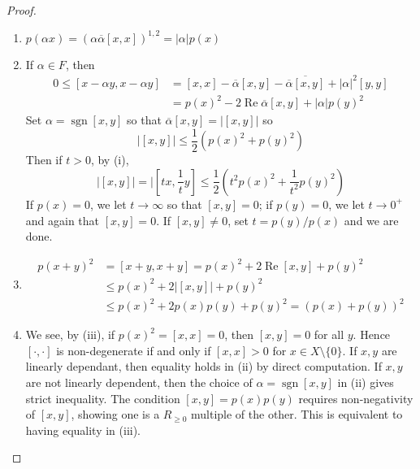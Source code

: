 \documentclass[11pt, a4paper]{memoir}
\theoremstyle{change}
\theoremstyle{plain}
\theoremstyle{nonumberplain}
\newtheorem{proof}{Proof}
\DeclareMathOperator{\sgn}{sgn}
\renewcommand{\Re}{\ensuremath{\operatorname{Re}}}
\newcommand{\lbr}[1]{\ensuremath{\left[#1\right]}}
\numberwithin{equation}{section}
\begin{document}
\begin{proof}
    \begin{enumerate}[nl,r]
        \item $p(\alpha x)=(\alpha\overline{\alpha}\lbr{x,x})^{1,2}=|\alpha|p(x)$
        \item If $\alpha\in F$, then
            \begin{align*}
                0\leq \lbr{x-\alpha y,x-\alpha y}&=\lbr{x,x}-\overline{\alpha}\lbr{x,y}-\overline{\overline{\alpha}\lbr{x,y}}+|\alpha|^2\lbr{y,y}\\
                                                 &= p(x)^2-2\Re\overline{\alpha}\lbr{x,y}+|\alpha|p(y)^2
            \end{align*}
            Set $\alpha=\sgn\lbr{x,y}$ so that $\overline{\alpha}\lbr{x,y}=|\lbr{x,y}|$ so
            \begin{equation*}
                |\lbr{x,y}|\leq\frac{1}{2}\left(p(x)^2+p(y)^2\right)
            \end{equation*}
            Then if $t>0$, by (i),
            \begin{equation*}
                |\lbr{x,y}|=|\lbr{tx,\frac{1}{t}y}\leq\frac{1}{2}(t^2p(x)^2+\frac{1}{t^2}p(y)^2)
            \end{equation*}
            If $p(x)=0$, we let $t\to\infty$ so that $\lbr{x,y}=0$; if $p(y)=0$, we let $t\to 0^+$ and again that $\lbr{x,y}=0$.
            If $\lbr{x,y}\neq 0$, set $t=p(y)/p(x)$ and we are done.
        \item
            \begin{align*}
                p(x+y)^2&=\lbr{x+y,x+y}=p(x)^2+2\Re[x,y]+p(y)^2\\
                        &\leq p(x)^2+2|\lbr{x,y}|+p(y)^2\\
                        &\leq p(x)^2+2p(x)p(y)+p(y)^2=(p(x)+p(y))^2
            \end{align*}
        \item We see, by (iii), if $p(x)^2=\lbr{x,x}=0$, then $\lbr{x,y}=0$ for all $y$.
            Hence $\lbr{\cdot,\cdot}$ is non-degenerate if and only if $\lbr{x,x}>0$ for $x\in X\setminus\{0\}$.
            If $x,y$ are linearly dependant, then equality holds in (ii) by direct computation.
            If $x,y$ are not linearly dependent, then the choice of $\alpha=\sgn\lbr{x,y}$ in (ii) gives strict inequality.
            The condition $\lbr{x,y}=p(x)p(y)$ requires non-negativity of $\lbr{x,y}$, showing one is a $R_{\geq 0}$ multiple of the other.
            This is equivalent to having equality in (iii).
    \end{enumerate}
\end{proof}
\end{document}
